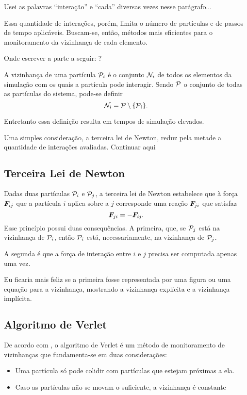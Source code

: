 \alert{Usei as palavras ``interação'' e ``cada'' diversas vezes nesse parágrafo...}

Essa quantidade de interações, porém, limita o número de partículas e de passos de tempo aplicáveis. Buscam-se, então, métodos mais eficientes para o monitoramento da vizinhança de cada elemento. 

\alert{Onde escrever a parte a seguir: ?}

A vizinhança de uma partícula \(\particlei\) é o conjunto \({\mathcal{N}}_{i}\) de todos os elementos da simulação com os quais a partícula pode interagir. Sendo \(\mathcal{P}\) o conjunto de todas as partículas do sistema, pode-se definir
\begin{equation*}
	\neighborhoodi = \particleSet \setminus \Bqty{\particlei}.
\end{equation*}

Entretanto essa definição resulta em tempos de simulação elevados.

Uma simples consideração, a terceira lei de Newton, reduz pela metade a quantidade de interações avaliadas. \alert{Continuar aqui}

\subsection{Terceira Lei de Newton}

Dadas duas partículas \(\particlei\) e \(\particlej\), a terceira lei de Newton estabelece que à força \({\bm{F}}_{i j}\) que a partícula \(i\) aplica sobre a \(j\) corresponde uma reação \({\bm{F}}_{j i}\) que satisfaz
\begin{equation*}
	{\bm{F}}_{j i} = -{\bm{F}}_{i j}.
\end{equation*}
Esse princípio possui duas consequências. A primeira, que, se \(\particlej\) está na vizinhança de \(\particlei\), então \(\particlei\) está, necessariamente, na vizinhança de \(\particlej\).

A segunda é que a força de interação entre \(i\) e \(j\) precisa ser computada apenas uma vez.

\alert{Eu ficaria mais feliz se a primeira fosse representada por uma figura ou uma equação para a vizinhança, mostrando a vizinhança explícita e a vizinhança implícita.}

\subsection{Algoritmo de Verlet}

De acordo com , o algoritmo de Verlet é um método de monitoramento de vizinhanças que fundamenta-se em duas considerações:
\begin{itemize}
	\item Uma partícula só pode colidir com partículas que estejam próximas a ela.
	\item \alert{Caso as partículas não se movam o suficiente, a vizinhança é constante}
\end{itemize}

